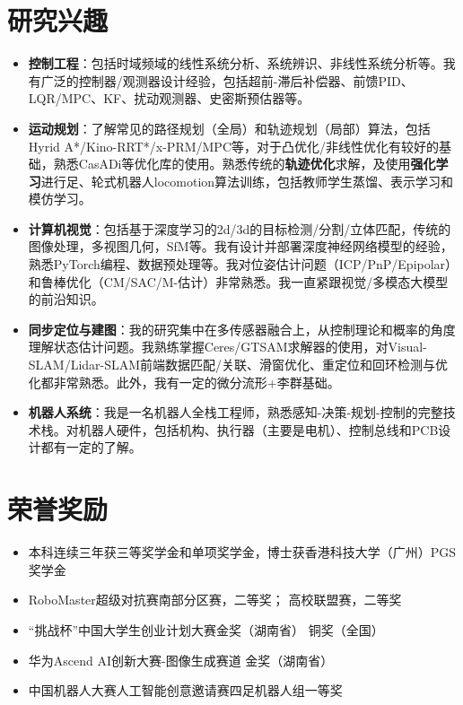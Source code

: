 \documentclass{resume}
\begin{document}
\section{研究兴趣}

\begin{itemize}
    \item \textbf{控制工程}：包括时域频域的线性系统分析、系统辨识、非线性系统分析等。我有广泛的控制器/观测器设计经验，包括超前-滞后补偿器、前馈PID、LQR/MPC、KF、扰动观测器、史密斯预估器等。
    \item  \textbf{运动规划}：了解常见的路径规划（全局）和轨迹规划（局部）算法，包括Hyrid A*/Kino-RRT*/x-PRM/MPC等，对于凸优化/非线性优化有较好的基础，熟悉CasADi等优化库的使用。熟悉传统的\textbf{轨迹优化}求解，及使用\textbf{强化学习}进行足、轮式机器人locomotion算法训练，包括教师学生蒸馏、表示学习和模仿学习。
    \item \textbf{计算机视觉}：包括基于深度学习的2d/3d的目标检测/分割/立体匹配，传统的图像处理，多视图几何，SfM等。我有设计并部署深度神经网络模型的经验，熟悉PyTorch编程、数据预处理等。我对位姿估计问题（ICP/PnP/Epipolar）和鲁棒优化（CM/SAC/M-估计）非常熟悉。我一直紧跟视觉/多模态大模型的前沿知识。
    \item \textbf{同步定位与建图}：我的研究集中在多传感器融合上，从控制理论和概率的角度理解状态估计问题。我熟练掌握Ceres/GTSAM求解器的使用，对Visual-SLAM/Lidar-SLAM前端数据匹配/关联、滑窗优化、重定位和回环检测与优化都非常熟悉。此外，我有一定的微分流形+李群基础。
    \item \textbf{机器人系统}：我是一名机器人全栈工程师，熟悉感知-决策-规划-控制的完整技术栈。对机器人硬件，包括机构、执行器（主要是电机）、控制总线和PCB设计都有一定的了解。
\end{itemize}

\section{荣誉奖励}
\begin{itemize}[parsep=0.5ex]
  \item 本科连续三年获三等奖学金和单项奖学金，博士获香港科技大学（广州）PGS奖学金
  \item RoboMaster超级对抗赛南部分区赛，二等奖； 高校联盟赛，二等奖
  \item “挑战杯”中国大学生创业计划大赛\quad 金奖（湖南省） 铜奖（全国）
  \item 华为Ascend AI创新大赛-图像生成赛道 金奖（湖南省）
  \item 中国机器人大赛人工智能创意邀请赛\quad 四足机器人组\quad 一等奖
\end{itemize}
\end{document}
